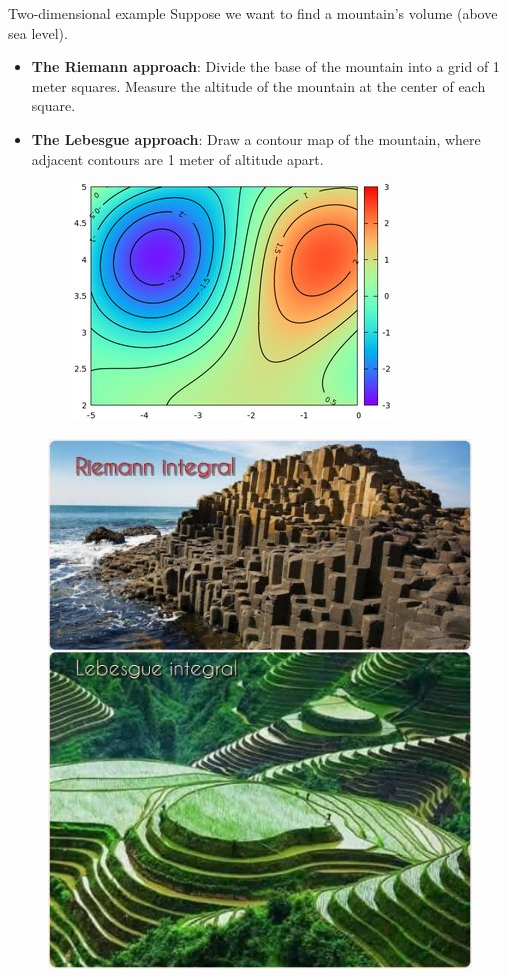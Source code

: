 \documentclass[10pt]{beamer}
\begin{document}
\begin{frame}{Two-dimensional example}
Suppose we want to find a mountain's volume (above sea level).

\begin{itemize}
\item \textbf{The Riemann approach}: Divide the base of the mountain into a grid of 1 meter squares. Measure the altitude of the mountain at the center of each square. 
\item \textbf{The Lebesgue approach}: Draw a contour map of the mountain, where adjacent contours are 1 meter of altitude apart. 

\begin{figure}[H]
\centering 
\includegraphics[width=.4\textwidth]{images/contour_plot}
\end{figure}
\end{itemize}
\end{frame}


\begin{frame}[standout]
\begin{figure}[H]
\centering 
\includegraphics[width=.6\textwidth]{images/riemann_vs_lebesgue.jpg}
\end{figure}
\end{frame}
\end{document}
